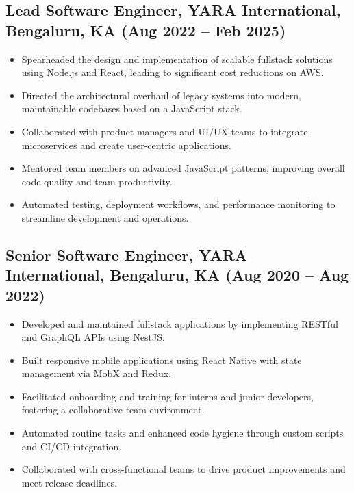 \documentclass[10pt,a4paper]{article}
\begin{document}
\subsection*{Lead Software Engineer, YARA International, Bengaluru, KA (Aug 2022 -- Feb 2025)}
\begin{itemize}[leftmargin=*]
  \item Spearheaded the design and implementation of scalable fullstack solutions using Node.js and React, leading to significant cost reductions on AWS.
  \item Directed the architectural overhaul of legacy systems into modern, maintainable codebases based on a JavaScript stack.
  \item Collaborated with product managers and UI/UX teams to integrate microservices and create user-centric applications.
  \item Mentored team members on advanced JavaScript patterns, improving overall code quality and team productivity.
  \item Automated testing, deployment workflows, and performance monitoring to streamline development and operations.
\end{itemize}

\subsection*{Senior Software Engineer, YARA International, Bengaluru, KA (Aug 2020 -- Aug 2022)}
\begin{itemize}[leftmargin=*]
  \item Developed and maintained fullstack applications by implementing RESTful and GraphQL APIs using NestJS.
  \item Built responsive mobile applications using React Native with state management via MobX and Redux.
  \item Facilitated onboarding and training for interns and junior developers, fostering a collaborative team environment.
  \item Automated routine tasks and enhanced code hygiene through custom scripts and CI/CD integration.
  \item Collaborated with cross-functional teams to drive product improvements and meet release deadlines.
\end{itemize}
\end{document}
